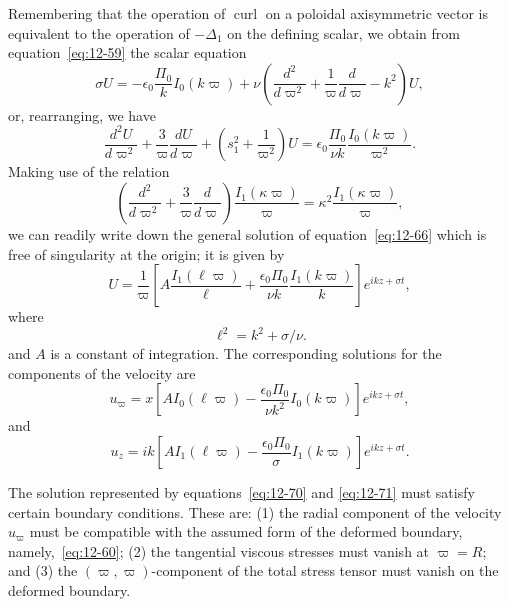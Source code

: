 Remembering that the operation of $\operatorname{curl}$ on a poloidal axisymmetric vector is equivalent to the operation of $-\Delta_1$ on the defining scalar, we obtain from equation~\eqref{eq:12-59} the scalar equation
\begin{equation}
\label{eq:12-65}
\sigma U = -\epsilon_0 \frac{\Pi_0}{k} I_0(k\varpi) + \nu \left(\frac{d^2}{d\varpi^2} + \frac{1}{\varpi}\frac{d}{d\varpi} - k^2\right)U,
\end{equation}
or, rearranging, we have
\begin{equation}
\label{eq:12-66}
\frac{d^2 U}{d\varpi^2} + \frac{3}{\varpi}\frac{dU}{d\varpi} + \left(s_1^2 + \frac{1}{\varpi^2}\right)U = \epsilon_0 \frac{\Pi_0}{\nu k} \frac{I_0(k\varpi)}{\varpi^2}.
\end{equation}
Making use of the relation
\begin{equation}
\label{eq:12-67}
\left(\frac{d^2}{d\varpi^2} + \frac{3}{\varpi}\frac{d}{d\varpi}\right) \frac{I_1(\kappa\varpi)}{\varpi} = \kappa^2 \frac{I_1(\kappa\varpi)}{\varpi},
\end{equation}
we can readily write down the general solution of equation~\eqref{eq:12-66} which is free of singularity at the origin; it is given by
\begin{equation}
\label{eq:12-68}
U = \frac{1}{\varpi}\left[A \frac{I_1(\ell\varpi)}{\ell} + \frac{\epsilon_0 \Pi_0}{\nu k} \frac{I_1(k\varpi)}{k}\right] e^{ikz+\sigma t},
\end{equation}
where
\begin{equation}
\label{eq:12-69}
\ell^2 = k^2 + \sigma/\nu.
\end{equation}
and $A$ is a constant of integration. The corresponding solutions for the components of the velocity are
\begin{equation}
\label{eq:12-70}
u_\varpi = x \left[A I_0(\ell\varpi) - \frac{\epsilon_0 \Pi_0}{\nu k^2} I_0(k\varpi)\right] e^{ikz+\sigma t},
\end{equation}
and
\begin{equation}
\label{eq:12-71}
u_z = ik\left[A I_1(\ell\varpi) - \frac{\epsilon_0 \Pi_0}{\sigma} I_1(k\varpi)\right] e^{ikz+\sigma t}.
\end{equation}

The solution represented by equations~\eqref{eq:12-70} and \eqref{eq:12-71} must satisfy certain boundary conditions. These are: (1) the radial component of the velocity $u_\varpi$ must be compatible with the assumed form of the deformed boundary, namely,~\eqref{eq:12-60}; (2) the tangential viscous stresses must vanish at $\varpi = R$; and (3) the $(\varpi,\varpi)$-component of the total stress tensor must vanish on the deformed boundary.

